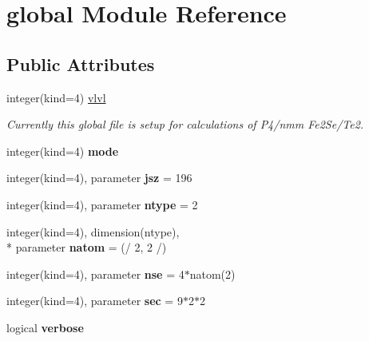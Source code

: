 \hypertarget{classglobal}{\section{global Module Reference}
\label{classglobal}
}
\subsection*{Public Attributes}
\begin{DoxyCompactItemize}
\item 
integer(kind=4) \hyperlink{classglobal_a57714656ed3fc78e7923fea192edaf85}{vlvl}
\begin{DoxyCompactList}\small\item\em Currently this global file is setup for calculations of P4/nmm Fe2\-Se/\-Te2. \end{DoxyCompactList}\item 
\hypertarget{classglobal_ac1f2f70a16733fd087f0c5eac3f7d7e4}{integer(kind=4) {\bfseries mode}}\label{classglobal_ac1f2f70a16733fd087f0c5eac3f7d7e4}

\item 
\hypertarget{classglobal_a8d2907fd80db91286fad32d07a1ad54a}{integer(kind=4), parameter {\bfseries jsz} = 196}\label{classglobal_a8d2907fd80db91286fad32d07a1ad54a}

\item 
\hypertarget{classglobal_aeb4ccd4081ab15144f11d282dd45d3fc}{integer(kind=4), parameter {\bfseries ntype} = 2}\label{classglobal_aeb4ccd4081ab15144f11d282dd45d3fc}

\item 
\hypertarget{classglobal_acade694fa80d067ffa262067a7593881}{integer(kind=4), dimension(ntype), \\*
parameter {\bfseries natom} = (/ 2, 2 /)}\label{classglobal_acade694fa80d067ffa262067a7593881}

\item 
\hypertarget{classglobal_a9bb221d7ab287e3ae69cc5cd00b41f40}{integer(kind=4), parameter {\bfseries nse} = 4$\ast$natom(2)}\label{classglobal_a9bb221d7ab287e3ae69cc5cd00b41f40}

\item 
\hypertarget{classglobal_a7632e2bba92b775355277d7647224ad3}{integer(kind=4), parameter {\bfseries sec} = 9$\ast$2$\ast$2}\label{classglobal_a7632e2bba92b775355277d7647224ad3}

\item 
\hypertarget{classglobal_a3eaa05af547ca0e62eaf5223edc725ec}{logical {\bfseries verbose}}\label{classglobal_a3eaa05af547ca0e62eaf5223edc725ec}


\end{DoxyCompactItemize}
